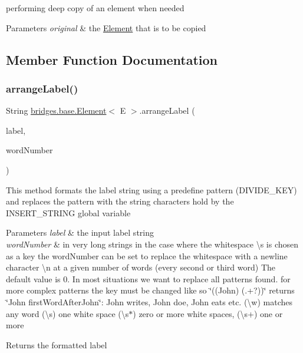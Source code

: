 performing deep copy of an element when needed


\begin{DoxyParams}{Parameters}
{\em original} & the \mbox{\hyperlink{classbridges_1_1base_1_1_element}{Element}} that is to be copied \\
\hline
\end{DoxyParams}


\subsection{Member Function Documentation}
\mbox{\label{classbridges_1_1base_1_1_element_acd2191242df8a7bf2e8b6ced87880ba6}} 
\subsubsection{\texorpdfstring{arrange\+Label()}{arrangeLabel()}}
{\footnotesize\ttfamily String \mbox{\hyperlink{classbridges_1_1base_1_1_element}{bridges.\+base.\+Element}}$<$ E $>$.arrange\+Label (\begin{DoxyParamCaption}\item[{String}]{label,  }\item[{int}]{word\+Number }\end{DoxyParamCaption})}

This method formats the label string using a predefine pattern (D\+I\+V\+I\+D\+E\+\_\+\+K\+EY) and replaces the pattern with the string characters hold by the I\+N\+S\+E\+R\+T\+\_\+\+S\+T\+R\+I\+NG global variable


\begin{DoxyParams}{Parameters}
{\em label} & the input label string\\
\hline
{\em word\+Number} & in very long strings in the case where the whitespace \textbackslash{}s is chosen as a key the word\+Number can be set to replace the whitespace with a newline character \textbackslash{}n at a given number of words (every second or third word) The default value is 0. In most situations we want to replace all patterns found. for more complex patterns the key must be changed like so \char`\"{}((\+John) (.+?))\char`\"{} returns \char`\"{}\+John first\+Word\+After\+John\char`\"{}\+: John writes, John doe, John eats etc. (\textbackslash{}w) matches any word (\textbackslash{}s) one white space (\textbackslash{}s$\ast$) zero or more white spaces, (\textbackslash{}s+) one or more\\
\hline
\end{DoxyParams}
\begin{DoxyReturn}{Returns}
the formatted label 
\end{DoxyReturn}
\mbox{\label{classbridges_1_1base_1_1_element_a6cd4c4f15c6a4f87f59e443cffe87a20}} 
